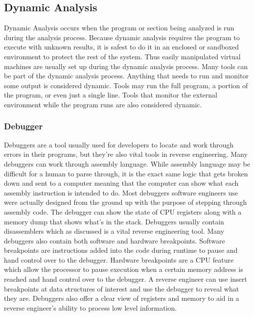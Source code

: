 \subsection{Dynamic Analysis}
Dynamic Analysis occurs when the program or section being analyzed is run during the analysis process. 
Because dynamic analysis requires the program to execute with unknown results, it is safest to do it in an enclosed or sandboxed environment to protect the rest of the system. 
Thus easily manipulated virtual machines are usually set up during the dynamic analysis process.
Many tools can be part of the dynamic analysis process. 
Anything that needs to run and monitor some output is considered dynamic. 
Tools may run the full program, a portion of the program, or even just a single line. 
Tools that monitor the external environment while the program runs are also considered dynamic.

\subsubsection{Debugger}
Debuggers are a tool usually used for developers to locate and work through errors in their programs, but they’re also vital tools in reverse engineering. 
Many debuggers can work through assembly language. 
While assembly language may be difficult for a human to parse through, it is the exact same logic that gets broken down and sent to a computer meaning that the computer can show what each assembly instruction is intended to do. 
Most debuggers software engineers use were actually designed from the ground up with the purpose of stepping through assembly code. 
The debugger can show the state of CPU registers along with a memory dump that shows what’s in the stack. 
Debuggers usually contain disassemblers which as discussed is a vital reverse engineering tool. 
Many debuggers also contain both software and hardware breakpoints. 
Software breakpoints are instructions added into the code during runtime to pause and hand control over to the debugger. 
Hardware breakpoints are a CPU feature which allow the processor to pause execution when a certain memory address is reached and hand control over to the debugger. 
A reverse engineer can use insert breakpoints at data structures of interest and use the debugger to reveal what they are. 
Debuggers also offer a clear view of registers and memory to aid in a reverse engineer's ability to process low level information.

